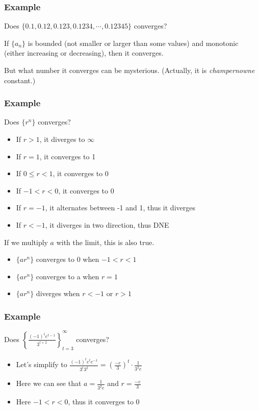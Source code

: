 \documentclass[t]{beamer}
\theoremstyle{plain}
\theoremstyle{definition}
\begin{document}
\begin{frame}

\frametitle{Example}

Does $\{0.1, 0.12, 0.123, 0.1234, \cdots, 0.12345\}$ converges? \pause

\medskip

If $\{a_n\}$ is bounded (not smaller or larger than some values) and monotonic (either increasing or decreasing), then it converges.

\medskip

But what number it converges can be mysterious.  (Actually, it is \textit{champernowne} constant.)

\end{frame}

\begin{frame}

\frametitle{Example}

Does $\{r^n\}$ converges? \pause

\begin{itemize}
	\item If $r > 1$, it diverges to $\infty$
	\item If $r = 1$, it converges to 1
	\item If $0 \leq r < 1$, it converges to 0
	\item If $-1 < r < 0$,  it converges to 0
	\item If $r = -1$, it alternates between -1 and 1, thus it diverges
	\item If $r < -1$, it diverges in two direction, thus DNE
\end{itemize}

If we multiply $a$ with the limit, this is also true.

\begin{itemize}
	\item $\{ar^n\}$ converges to 0 when $-1 < r < 1$
	\item $\{ar^n\}$ converges to a when $r = 1$
	\item $\{ar^n\}$ diverges when $r < -1$ or $r > 1$
\end{itemize}

\end{frame}


\begin{frame}

\frametitle{Example}

Does $\left\{  \frac{(-1)^{t} e^{t - 1}}{3^{t + 2}}  \right\}_{t=3}^{\infty}$ converges? \pause

\medskip

\begin{itemize}
	\item Let's simplify to $\frac{(-1)^t e^t e^{-1}}{3^t 3^2} = (\frac{-e}{3})^t \cdot \frac{1}{3^2 e}$
	\item Here we can see that $a = \frac{1}{3^2 e}$ and $r = \frac{-e}{3}$
	\item Here $-1 < r <0$, thus it converges to 0
\end{itemize}

\end{frame}
\end{document}
